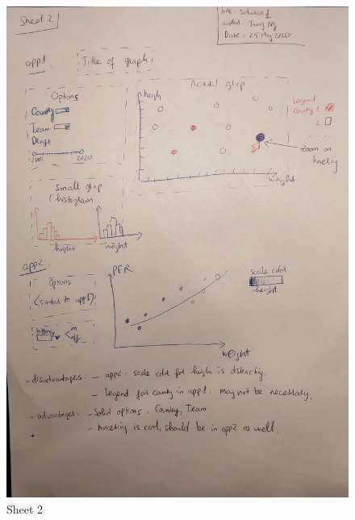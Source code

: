 \documentclass[a4paper,12pt,twoside]{article}
\numberwithin{equation}{section}
\begin{document}
\begin{figure}[h]
\caption{Sheet 2}
\includegraphics[scale=0.15]{o5.jpg}
\centering
\end{figure}
\end{document}
